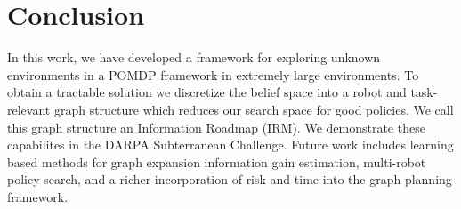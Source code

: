 \documentclass{article}
\begin{document}
\section{Conclusion}

In this work, we have developed a framework for exploring unknown environments in a POMDP framework in extremely large environments.  
To obtain a tractable solution we discretize the belief space into a robot and task-relevant graph structure which reduces our search space for good policies.  We call this graph structure an Information Roadmap (IRM).  We demonstrate these capabilites in the DARPA Subterranean Challenge.  Future work includes learning based methods for graph expansion information gain estimation, multi-robot policy search, and a richer incorporation of risk and time into the graph planning framework.






\end{document}
